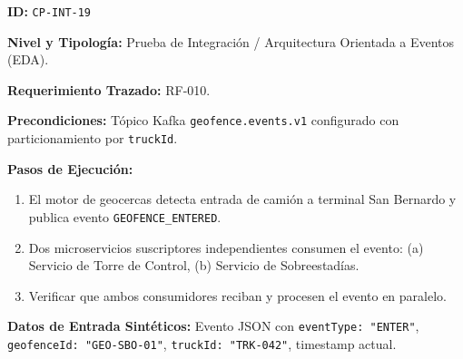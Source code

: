 \par\noindent\textbf{ID:} \texttt{C\allowbreak{}P\allowbreak{}-\allowbreak{}I\allowbreak{}N\allowbreak{}T\allowbreak{}-\allowbreak{}1\allowbreak{}9\allowbreak{}}\par
\par\noindent\textbf{Nivel y Tipología:} Prueba de Integración / Arquitectura Orientada a Eventos (EDA).\par
\par\noindent\textbf{Requerimiento Trazado:} RF-010.\par
\par\noindent\textbf{Precondiciones:} Tópico Kafka \texttt{g\allowbreak{}e\allowbreak{}o\allowbreak{}f\allowbreak{}e\allowbreak{}n\allowbreak{}c\allowbreak{}e\allowbreak{}.\allowbreak{}e\allowbreak{}v\allowbreak{}e\allowbreak{}n\allowbreak{}t\allowbreak{}s\allowbreak{}.\allowbreak{}v\allowbreak{}1\allowbreak{}} configurado con particionamiento por \texttt{t\allowbreak{}r\allowbreak{}u\allowbreak{}c\allowbreak{}k\allowbreak{}I\allowbreak{}d\allowbreak{}}.\par
\par\noindent\textbf{Pasos de Ejecución:} \par
\begin{enumerate}
\item El motor de geocercas detecta entrada de camión a terminal San Bernardo y publica evento \texttt{G\allowbreak{}E\allowbreak{}O\allowbreak{}F\allowbreak{}E\allowbreak{}N\allowbreak{}C\allowbreak{}E\allowbreak{}\_\allowbreak{}E\allowbreak{}N\allowbreak{}T\allowbreak{}E\allowbreak{}R\allowbreak{}E\allowbreak{}D\allowbreak{}}.
\item Dos microservicios suscriptores independientes consumen el evento: (a) Servicio de Torre de Control, (b) Servicio de Sobreestadías.
\item Verificar que ambos consumidores reciban y procesen el evento en paralelo.
\end{enumerate}
\par\noindent\textbf{Datos de Entrada Sintéticos:} Evento JSON con \texttt{e\allowbreak{}v\allowbreak{}e\allowbreak{}n\allowbreak{}t\allowbreak{}T\allowbreak{}y\allowbreak{}p\allowbreak{}e\allowbreak{}:\allowbreak{} "\allowbreak{}E\allowbreak{}N\allowbreak{}T\allowbreak{}E\allowbreak{}R\allowbreak{}"\allowbreak{}}, \texttt{g\allowbreak{}e\allowbreak{}o\allowbreak{}f\allowbreak{}e\allowbreak{}n\allowbreak{}c\allowbreak{}e\allowbreak{}I\allowbreak{}d\allowbreak{}:\allowbreak{} "\allowbreak{}G\allowbreak{}E\allowbreak{}O\allowbreak{}-\allowbreak{}S\allowbreak{}B\allowbreak{}O\allowbreak{}-\allowbreak{}0\allowbreak{}1\allowbreak{}"\allowbreak{}}, \texttt{t\allowbreak{}r\allowbreak{}u\allowbreak{}c\allowbreak{}k\allowbreak{}I\allowbreak{}d\allowbreak{}:\allowbreak{} "\allowbreak{}T\allowbreak{}R\allowbreak{}K\allowbreak{}-\allowbreak{}0\allowbreak{}4\allowbreak{}2\allowbreak{}"\allowbreak{}}, timestamp actual.\par
